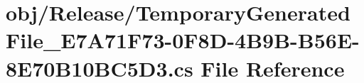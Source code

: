 \hypertarget{_release_2_temporary_generated_file___e7_a71_f73-0_f8_d-4_b9_b-_b56_e-8_e70_b10_b_c5_d3_8cs}{
\section{obj/Release/TemporaryGeneratedFile\_\-E7A71F73-\/0F8D-\/4B9B-\/B56E-\/8E70B10BC5D3.cs File Reference}
\label{_release_2_temporary_generated_file___e7_a71_f73-0_f8_d-4_b9_b-_b56_e-8_e70_b10_b_c5_d3_8cs}
}
